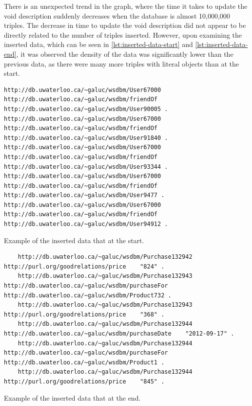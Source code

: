 There is an unexpected trend in the graph, where the time it takes to update the \gls{void} description suddenly decreases when the database is almost 10,000,000 triples. The decrease in time to update the \gls{void} description did not appear to be directly related to the number of triples inserted. However, upon examining the inserted data, which can be seen in \autoref{lst:inserted-data-start} and \autoref{lst:inserted-data-end}, it was observed the density of the data was significantly lower than the previous data, as there were many more triples with literal objects than at the start.

\begin{listing}
    \begin{verbatim}
http://db.uwaterloo.ca/~galuc/wsdbm/User67000    http://db.uwaterloo.ca/~galuc/wsdbm/friendOf    http://db.uwaterloo.ca/~galuc/wsdbm/User90005 .
http://db.uwaterloo.ca/~galuc/wsdbm/User67000    http://db.uwaterloo.ca/~galuc/wsdbm/friendOf    http://db.uwaterloo.ca/~galuc/wsdbm/User91840 .
http://db.uwaterloo.ca/~galuc/wsdbm/User67000    http://db.uwaterloo.ca/~galuc/wsdbm/friendOf    http://db.uwaterloo.ca/~galuc/wsdbm/User93344 .
http://db.uwaterloo.ca/~galuc/wsdbm/User67000    http://db.uwaterloo.ca/~galuc/wsdbm/friendOf    http://db.uwaterloo.ca/~galuc/wsdbm/User9477 .
http://db.uwaterloo.ca/~galuc/wsdbm/User67000    http://db.uwaterloo.ca/~galuc/wsdbm/friendOf    http://db.uwaterloo.ca/~galuc/wsdbm/User94912 .
\end{verbatim}
    \caption{Example of the inserted data that at the start.}
    \label{lst:inserted-data-start}
\end{listing}

\begin{listing}
    \begin{verbatim}
    http://db.uwaterloo.ca/~galuc/wsdbm/Purchase132942    http://purl.org/goodrelations/price    "824" .
    http://db.uwaterloo.ca/~galuc/wsdbm/Purchase132943    http://db.uwaterloo.ca/~galuc/wsdbm/purchaseFor    http://db.uwaterloo.ca/~galuc/wsdbm/Product732 .
    http://db.uwaterloo.ca/~galuc/wsdbm/Purchase132943    http://purl.org/goodrelations/price    "368" .
    http://db.uwaterloo.ca/~galuc/wsdbm/Purchase132944    http://db.uwaterloo.ca/~galuc/wsdbm/purchaseDate    "2012-09-17" .
    http://db.uwaterloo.ca/~galuc/wsdbm/Purchase132944    http://db.uwaterloo.ca/~galuc/wsdbm/purchaseFor    http://db.uwaterloo.ca/~galuc/wsdbm/Product1 .
    http://db.uwaterloo.ca/~galuc/wsdbm/Purchase132944    http://purl.org/goodrelations/price    "845" .        
\end{verbatim}
    \caption{Example of the inserted data that at the end.}
    \label{lst:inserted-data-end}
\end{listing}

